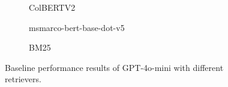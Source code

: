 \begin{figure}
\centering

\begin{subfigure}[b]{1.0\textwidth}
    
    \vspace{-1.0em}
    \caption{\scriptsize ColBERTV2}\label{fig:scores_colbert}
\end{subfigure}

\vspace{1.0em}

\begin{subfigure}[b]{0.49\textwidth}
    
    \caption{\scriptsize msmarco-bert-base-dot-v5}\label{fig:scores_dense}
\end{subfigure}
\begin{subfigure}[b]{0.49\textwidth}
    
    \caption{\scriptsize BM25}\label{fig:scores_bm25}
\end{subfigure}

\caption{Baseline performance results of GPT-4o-mini with different retrievers.}
\label{fig:scores_gpt4o}
\end{figure}